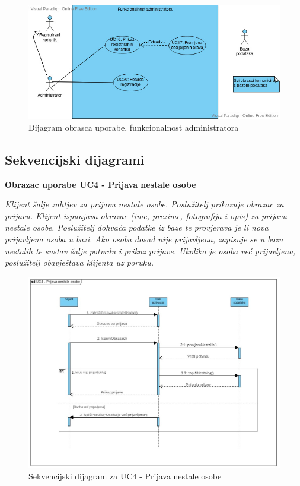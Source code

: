 				    \begin{figure}[H] \includegraphics[width=\linewidth]{dijagrami/UML3.vpd.jpg} 
				    \caption{Dijagram obrasca uporabe, funkcionalnost administratora}
				    \end{figure} 
					
				\eject		
				
				\subsection{Sekvencijski dijagrami}
				
				\textbf{Obrazac uporabe UC4 - Prijava nestale osobe}
    
                \textit{Klijent šalje zahtjev za prijavu nestale osobe. Poslužitelj prikazuje obrazac za prijavu. Klijent ispunjava obrazac (ime, prezime, fotografija i opis) za prijavu nestale osobe. Poslužitelj dohvaća podatke iz baze te provjerava je li nova prijavljena osoba u bazi. Ako osoba dosad nije prijavljena, zapisuje se u bazu nestalih te sustav šalje potvrdu i prikaz prijave. Ukoliko je osoba već prijavljena, poslužitelj obavještava klijenta uz poruku.}

                \begin{figure}[H] \includegraphics[width=\linewidth]{dokumentacija/dijagrami/PrijavaNestalog.jpg}
				    \caption{Sekvencijski dijagram za UC4 - Prijava nestale osobe}
				    \end{figure}

